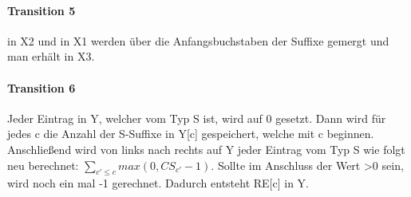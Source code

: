 \paragraph{Transition 5}
\SAlxlynot in X2 und \SAlxnot in X1 werden über die Anfangsbuchstaben der Suffixe gemergt und man erhält \SAlynot in X3.
\paragraph{Transition 6}
Jeder Eintrag in Y, welcher vom Typ S ist, wird auf 0 gesetzt. Dann wird für jedes c die Anzahl der S-Suffixe in Y[c] gespeichert, welche mit c beginnen. Anschließend wird von links nach rechts auf Y jeder Eintrag vom Typ S wie folgt neu berechnet: $\sum_{c'\leq c} max(0, CS_{c'}-1)$. Sollte im Anschluss der Wert >0 sein, wird noch ein mal -1 gerechnet. Dadurch entsteht RE[c] in Y.
